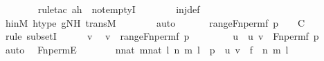 \begin{isabellebody}
\ \ \ \ \ \ \ \isamarkupfalse%
{\isacharparenleft}{\kern0pt}rule{\isacharunderscore}{\kern0pt}tac\ a{\isacharequal}{\kern0pt}h\ \ not{\isacharunderscore}{\kern0pt}emptyI{\isacharparenright}{\kern0pt}\isanewline
\ \ \ \ \ \ \isamarkupfalse%
\ inj{\isacharunderscore}{\kern0pt}def\ \isanewline
\ \ \ \ \ \ \isamarkupfalse%
\ hinM\ htype\ gNH\ transM\isanewline
\ \ \ \ \ \ \isamarkupfalse%
\ auto\isanewline
\ \ \isamarkupfalse%
\isanewline
\isanewline
\ \ \isamarkupfalse%
\ {\isachardoublequoteopen}range{\isacharparenleft}{\kern0pt}Fn{\isacharunderscore}{\kern0pt}perm{\isacharparenleft}{\kern0pt}f{\isacharcomma}{\kern0pt}\ p{\isacharparenright}{\kern0pt}{\isacharparenright}{\kern0pt}\ {\isasymsubseteq}\ {}{\isachardoublequoteclose}\ {\isacharparenleft}{\kern0pt}\ {\isacharquery}{\kern0pt}C{\isacharparenright}{\kern0pt}\isanewline
\ \ \isamarkupfalse%
\ {\isacharparenleft}{\kern0pt}rule\ subsetI{\isacharparenright}{\kern0pt}\isanewline
\ \ \ \ \isamarkupfalse%
\ v\ \isamarkupfalse%
\ {\isachardoublequoteopen}v\ {\isasymin}\ range{\isacharparenleft}{\kern0pt}Fn{\isacharunderscore}{\kern0pt}perm{\isacharparenleft}{\kern0pt}f{\isacharcomma}{\kern0pt}\ p{\isacharparenright}{\kern0pt}{\isacharparenright}{\kern0pt}{\isachardoublequoteclose}\ \isanewline
\ \ \ \ \isamarkupfalse%
\ \isamarkupfalse%
\ u\ \ {\isachardoublequoteopen}{\isacharless}{\kern0pt}u{\isacharcomma}{\kern0pt}\ v{\isachargreater}{\kern0pt}\ {\isasymin}\ Fn{\isacharunderscore}{\kern0pt}perm{\isacharparenleft}{\kern0pt}f{\isacharcomma}{\kern0pt}\ p{\isacharparenright}{\kern0pt}{\isachardoublequoteclose}\ \isamarkupfalse%
\ auto\ \isamarkupfalse%
\ Fn{\isacharunderscore}{\kern0pt}permE\isanewline
\ \ \ \ \isamarkupfalse%
\ \isamarkupfalse%
\ {\isachardoublequoteopen}{\isasymexists}n{\isasymin}nat{\isachardot}{\kern0pt}\ {\isasymexists}m{\isasymin}nat{\isachardot}{\kern0pt}\ {\isasymexists}l{\isasymin}{}{\isachardot}{\kern0pt}\ {\isasymlangle}{\isasymlangle}n{\isacharcomma}{\kern0pt}\ m{\isasymrangle}{\isacharcomma}{\kern0pt}\ l{\isasymrangle}\ {\isasymin}\ p\ {\isasymand}\ {\isacharless}{\kern0pt}u{\isacharcomma}{\kern0pt}\ v{\isachargreater}{\kern0pt}\ {\isacharequal}{\kern0pt}\ {\isasymlangle}{\isasymlangle}f\ {\isacharbackquote}{\kern0pt}\ n{\isacharcomma}{\kern0pt}\ m{\isasymrangle}{\isacharcomma}{\kern0pt}\ l{\isasymrangle}{\isachardoublequoteclose}\ \isanewline

\end{isabellebody}
